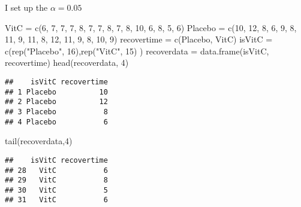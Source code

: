 \documentclass[
]{article}
\newenvironment{Shaded}{\begin{snugshade}}{\end{snugshade}}
\newcommand{\DecValTok}[1]{\textcolor[rgb]{0.00,0.00,0.81}{#1}}
\newcommand{\FunctionTok}[1]{\textcolor[rgb]{0.00,0.00,0.00}{#1}}
\newcommand{\NormalTok}[1]{#1}
\newcommand{\OtherTok}[1]{\textcolor[rgb]{0.56,0.35,0.01}{#1}}
\newcommand{\StringTok}[1]{\textcolor[rgb]{0.31,0.60,0.02}{#1}}
\begin{document}
I set up the \(\alpha = 0.05\)

\begin{Shaded}
\begin{Highlighting}[]
\NormalTok{VitC }\OtherTok{=} \FunctionTok{c}\NormalTok{(}\DecValTok{6}\NormalTok{, }\DecValTok{7}\NormalTok{, }\DecValTok{7}\NormalTok{, }\DecValTok{7}\NormalTok{, }\DecValTok{8}\NormalTok{, }\DecValTok{7}\NormalTok{, }\DecValTok{7}\NormalTok{, }\DecValTok{8}\NormalTok{, }\DecValTok{7}\NormalTok{, }\DecValTok{8}\NormalTok{, }\DecValTok{10}\NormalTok{, }\DecValTok{6}\NormalTok{, }\DecValTok{8}\NormalTok{, }\DecValTok{5}\NormalTok{, }\DecValTok{6}\NormalTok{)}
\NormalTok{Placebo }\OtherTok{=} \FunctionTok{c}\NormalTok{(}\DecValTok{10}\NormalTok{, }\DecValTok{12}\NormalTok{, }\DecValTok{8}\NormalTok{, }\DecValTok{6}\NormalTok{, }\DecValTok{9}\NormalTok{, }\DecValTok{8}\NormalTok{, }\DecValTok{11}\NormalTok{, }\DecValTok{9}\NormalTok{, }\DecValTok{11}\NormalTok{, }\DecValTok{8}\NormalTok{, }\DecValTok{12}\NormalTok{, }\DecValTok{11}\NormalTok{, }\DecValTok{9}\NormalTok{, }\DecValTok{8}\NormalTok{, }\DecValTok{10}\NormalTok{, }\DecValTok{9}\NormalTok{)}
\NormalTok{recovertime }\OtherTok{=} \FunctionTok{c}\NormalTok{(Placebo, VitC)}
\NormalTok{isVitC }\OtherTok{=} \FunctionTok{c}\NormalTok{(}\FunctionTok{rep}\NormalTok{(}\StringTok{"Placebo"}\NormalTok{, }\DecValTok{16}\NormalTok{),}\FunctionTok{rep}\NormalTok{(}\StringTok{"VitC"}\NormalTok{, }\DecValTok{15}\NormalTok{) )}
\NormalTok{recoverdata }\OtherTok{=} \FunctionTok{data.frame}\NormalTok{(isVitC, recovertime)}
\FunctionTok{head}\NormalTok{(recoverdata, }\DecValTok{4}\NormalTok{)}
\end{Highlighting}
\end{Shaded}

\begin{verbatim}
##    isVitC recovertime
## 1 Placebo          10
## 2 Placebo          12
## 3 Placebo           8
## 4 Placebo           6
\end{verbatim}

\begin{Shaded}
\begin{Highlighting}[]
\FunctionTok{tail}\NormalTok{(recoverdata,}\DecValTok{4}\NormalTok{)}
\end{Highlighting}
\end{Shaded}

\begin{verbatim}
##    isVitC recovertime
## 28   VitC           6
## 29   VitC           8
## 30   VitC           5
## 31   VitC           6
\end{verbatim}
\end{document}
